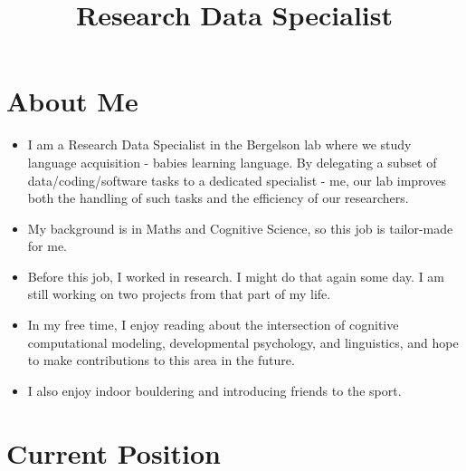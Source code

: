 \documentclass[11pt,a4paper,]{moderncv}
\title{Research Data Specialist}
\providecommand{\tightlist}{%
	\setlength{\itemsep}{0pt}\setlength{\parskip}{0pt}}
\begin{document}
\makecvtitle



\hypertarget{about-me}{%
\section{About Me}\label{about-me}}

\begin{itemize}
\tightlist
\item
  I am a Research Data Specialist in the Bergelson lab where we study
  language acquisition - babies learning language. By delegating a
  subset of data/coding/software tasks to a dedicated specialist - me,
  our lab improves both the handling of such tasks and the efficiency of
  our researchers.
\item
  My background is in Maths and Cognitive Science, so this job is
  tailor-made for me.
\item
  Before this job, I worked in research. I might do that again some day.
  I am still working on two projects from that part of my life.
\item
  In my free time, I enjoy reading about the intersection of cognitive
  computational modeling, developmental psychology, and linguistics, and
  hope to make contributions to this area in the future.
\item
  I also enjoy indoor bouldering and introducing friends to the sport.
\end{itemize}

\hypertarget{current-position}{%
\section{Current Position}\label{current-position}}
\end{document}
